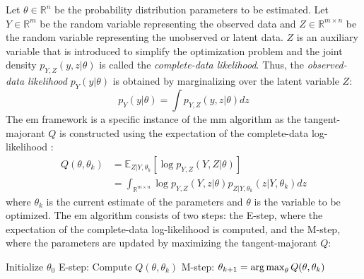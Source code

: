Let $\theta \in \mathbb{R}^n$ be the probability distribution parameters to be estimated. Let $Y \in \mathbb{R}^m$ be the random variable representing the observed data and $Z \in \mathbb{R}^{m \times n}$ be the random variable representing the unobserved or latent data.
$Z$ is an auxiliary variable that is introduced to simplify the optimization problem and the joint density $p_{Y, Z}(y, z|\theta)$ is called the \textit{complete-data likelihood}.
Thus, the \textit{observed-data likelihood} $p_{Y}(y|\theta)$ is obtained by marginalizing over the latent variable $Z$:
\begin{equation}
    p_{Y}(y|\theta) = \int p_{Y, Z}(y, z|\theta) dz
\end{equation}
The \acrfull{em} framework is a specific instance of the \acrshort{mm} algorithm as the tangent-majorant $Q$ is constructed using the expectation of the complete-data log-likelihood \cite{Lange2016,Dempster1977} :
\begin{align}
    Q(\theta, \theta_k) &= \mathbb{E}_{Z|Y, \theta_k}[\log p_{Y, Z}(Y, Z|\theta)] \\
    &= \int_{\mathbb{R}^{m \times n}} \log p_{Y, Z}(Y, z|\theta) p_{Z|Y, \theta_k}(z|Y, \theta_k) dz
\end{align}
where $\theta_k$ is the current estimate of the parameters and $\theta$ is the variable to be optimized.
The \acrshort{em} algorithm consists of two steps: the E-step, where the expectation of the complete-data log-likelihood is computed, and the M-step, where the parameters are updated by maximizing the tangent-majorant $Q$:
\begin{algorithm}
    \caption{Expectation-Maximization Algorithm}
    \begin{algorithmic}[1]
        \State Initialize $\theta_0$
            \State E-step: Compute $Q(\theta, \theta_k)$
            \State M-step: $\theta_{k+1} = \mathop{\mathrm{arg\,max}}_\theta Q(\theta, \theta_k)$
        \EndFor
    \end{algorithmic}
\end{algorithm}

